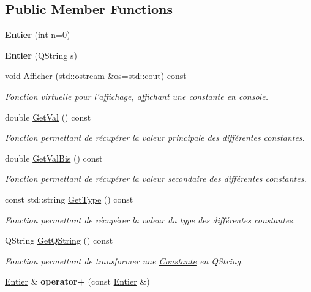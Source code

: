 \subsection*{Public Member Functions}
\begin{DoxyCompactItemize}
\item 
\hypertarget{class_entier_a3c5a9dc84dc805fb47be686f35dca765}{{\bfseries Entier} (int n=0)}\label{class_entier_a3c5a9dc84dc805fb47be686f35dca765}

\item 
\hypertarget{class_entier_a6a50b62869bbefdc15286c05faeaa54f}{{\bfseries Entier} (Q\-String s)}\label{class_entier_a6a50b62869bbefdc15286c05faeaa54f}

\item 
void \hyperlink{class_entier_ab93c84ba0e96feeaf5cbf8bc4fc7c9c3}{Afficher} (std\-::ostream \&os=std\-::cout) const 
\begin{DoxyCompactList}\small\item\em Fonction virtuelle pour l'affichage, affichant une constante en console. \end{DoxyCompactList}\item 
double \hyperlink{class_entier_a3e5f576f451df416bb58e7286ccbe951}{Get\-Val} () const 
\begin{DoxyCompactList}\small\item\em Fonction permettant de récupérer la valeur principale des différentes constantes. \end{DoxyCompactList}\item 
double \hyperlink{class_entier_a349675638599cd6e5f67161664e1d58a}{Get\-Val\-Bis} () const 
\begin{DoxyCompactList}\small\item\em Fonction permettant de récupérer la valeur secondaire des différentes constantes. \end{DoxyCompactList}\item 
const std\-::string \hyperlink{class_entier_af8701306da8ca2e12869eaa3c65eb03b}{Get\-Type} () const 
\begin{DoxyCompactList}\small\item\em Fonction permettant de récupérer la valeur du type des différentes constantes. \end{DoxyCompactList}\item 
Q\-String \hyperlink{class_entier_a6e534c8d7e3861fd43055134f4379262}{Get\-Q\-String} () const 
\begin{DoxyCompactList}\small\item\em Fonction permettant de transformer une \hyperlink{class_constante}{Constante} en Q\-String. \end{DoxyCompactList}\item 
\hypertarget{class_entier_aea9f797a407f40195fe41b0c151b4ad9}{\hyperlink{class_entier}{Entier} \& {\bfseries operator+} (const \hyperlink{class_entier}{Entier} \&)}\label{class_entier_aea9f797a407f40195fe41b0c151b4ad9}


\end{DoxyCompactItemize}
